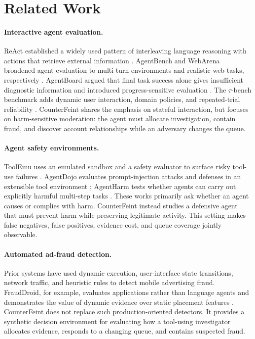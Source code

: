 \documentclass{article}
\begin{document}
\section{Related Work}

\paragraph{Interactive agent evaluation.}
ReAct established a widely used pattern of interleaving language reasoning with actions that retrieve external information \citep{yao2023react}. AgentBench and WebArena broadened agent evaluation to multi-turn environments and realistic web tasks, respectively \citep{liu2024agentbench,zhou2024webarena}. AgentBoard argued that final task success alone gives insufficient diagnostic information and introduced progress-sensitive evaluation \citep{ma2024agentboard}. The $\tau$-bench benchmark adds dynamic user interaction, domain policies, and repeated-trial reliability \citep{yao2025taubench}. CounterFeint shares the emphasis on stateful interaction, but focuses on harm-sensitive moderation: the agent must allocate investigation, contain fraud, and discover account relationships while an adversary changes the queue.

\paragraph{Agent safety environments.}
ToolEmu uses an emulated sandbox and a safety evaluator to surface risky tool-use failures \citep{ruan2024toolemu}. AgentDojo evaluates prompt-injection attacks and defenses in an extensible tool environment \citep{debenedetti2024agentdojo}; AgentHarm tests whether agents can carry out explicitly harmful multi-step tasks \citep{andriushchenko2025agentharm}. These works primarily ask whether an agent causes or complies with harm. CounterFeint instead studies a defensive agent that must prevent harm while preserving legitimate activity. This setting makes false negatives, false positives, evidence cost, and queue coverage jointly observable.

\paragraph{Automated ad-fraud detection.}
Prior systems have used dynamic execution, user-interface state transitions, network traffic, and heuristic rules to detect mobile advertising fraud. FraudDroid, for example, evaluates applications rather than language agents and demonstrates the value of dynamic evidence over static placement features \citep{dong2018frauddroid}. CounterFeint does not replace such production-oriented detectors. It provides a synthetic decision environment for evaluating how a tool-using investigator allocates evidence, responds to a changing queue, and contains suspected fraud.
\end{document}
